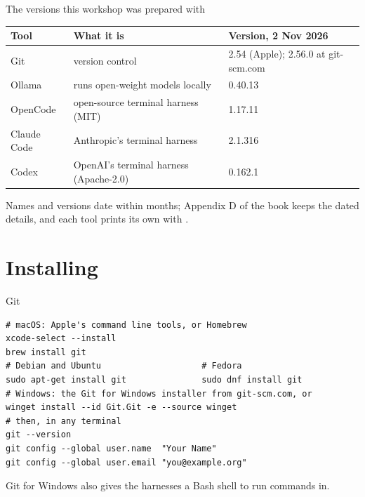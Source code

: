 \documentclass[11pt,aspectratio=169]{beamer}
\begin{document}
\begin{frame}{The versions this workshop was prepared with}
  \begin{tabularx}{\textwidth}{lXl}
    \toprule
    \textbf{Tool} & \textbf{What it is} & \textbf{Version, 2 Nov 2026} \\
    \midrule
    Git & version control & 2.54 (Apple); 2.56.0 at git-scm.com \\
    Ollama & runs open-weight models locally & 0.40.13 \\
    OpenCode & open-source terminal harness (MIT) & 1.17.11 \\
    Claude Code & Anthropic's terminal harness & 2.1.316 \\
    Codex & OpenAI's terminal harness (Apache-2.0) & 0.162.1 \\
    \bottomrule
  \end{tabularx}
  \medskip
  Names and versions date within months; Appendix D of the book keeps the
  dated details, and each tool prints its own with .
\end{frame}

\section{Installing}

\begin{frame}[fragile]{Git}
  \begin{lstlisting}[style=shell]
# macOS: Apple's command line tools, or Homebrew
xcode-select --install
brew install git
# Debian and Ubuntu                    # Fedora
sudo apt-get install git               sudo dnf install git
# Windows: the Git for Windows installer from git-scm.com, or
winget install --id Git.Git -e --source winget
# then, in any terminal
git --version
git config --global user.name  "Your Name"
git config --global user.email "you@example.org"
  \end{lstlisting}
  Git for Windows also gives the harnesses a Bash shell to run commands in.
\end{frame}
\end{document}
